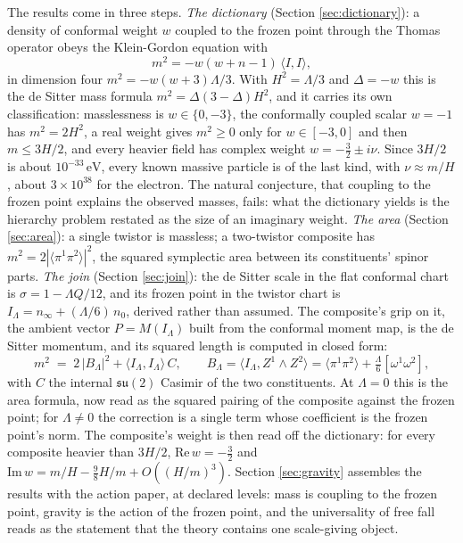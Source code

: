 \documentclass[11pt]{article}
\theoremstyle{definition}
\newcommand{\ip}[2]{\langle #1, #2\rangle}
\newcommand{\br}[1]{\langle #1\rangle}
\begin{document}
The results come in three steps. \emph{The dictionary} (Section \ref{sec:dictionary}): a density of conformal weight $w$ coupled to the frozen point through the Thomas operator obeys the Klein-Gordon equation with
\[
m^{2} = -w(w+n-1)\,\ip{I}{I},
\]
in dimension four $m^{2} = -w(w+3)\Lambda/3$. With $H^{2} = \Lambda/3$ and $\Delta = -w$ this is the de Sitter mass formula $m^{2} = \Delta(3-\Delta)H^{2}$, and it carries its own classification: masslessness is $w \in \{0, -3\}$, the conformally coupled scalar $w = -1$ has $m^{2} = 2H^{2}$, a real weight gives $m^{2} \ge 0$ only for $w \in [-3, 0]$ and then $m \le 3H/2$, and every heavier field has complex weight $w = -\tfrac32 \pm i\nu$. Since $3H/2$ is about $10^{-33}\,\mathrm{eV}$, every known massive particle is of the last kind, with $\nu \approx m/H$, about $3 \times 10^{38}$ for the electron. The natural conjecture, that coupling to the frozen point explains the observed masses, fails: what the dictionary yields is the hierarchy problem restated as the size of an imaginary weight. \emph{The area} (Section \ref{sec:area}): a single twistor is massless; a two-twistor composite has $m^{2} = 2|\br{\pi^{1}\pi^{2}}|^{2}$, the squared symplectic area between its constituents' spinor parts. \emph{The join} (Section \ref{sec:join}): the de Sitter scale in the flat conformal chart is $\sigma = 1 - \Lambda Q/12$, and its frozen point in the twistor chart is $I_{\Lambda} = n_{\infty} + (\Lambda/6)\,n_{0}$, derived rather than assumed. The composite's grip on it, the ambient vector $P = M(I_{\Lambda})$ built from the conformal moment map, is the de Sitter momentum, and its squared length is computed in closed form:
\[
m^{2} \;=\; 2\,|B_{\Lambda}|^{2} + \ip{I_{\Lambda}}{I_{\Lambda}}\,C, \qquad B_{\Lambda} = \ip{I_{\Lambda}}{Z^{1}\wedge Z^{2}} = \br{\pi^{1}\pi^{2}} + \tfrac{\Lambda}{6}[\omega^{1}\omega^{2}],
\]
with $C$ the internal $\mathfrak{su}(2)$ Casimir of the two constituents. At $\Lambda = 0$ this is the area formula, now read as the squared pairing of the composite against the frozen point; for $\Lambda \neq 0$ the correction is a single term whose coefficient is the frozen point's norm. The composite's weight is then read off the dictionary: for every composite heavier than $3H/2$, $\mathrm{Re}\,w = -\tfrac32$ and $\mathrm{Im}\,w = m/H - \tfrac98 H/m + O((H/m)^{3})$. Section \ref{sec:gravity} assembles the results with the action paper, at declared levels: mass is coupling to the frozen point, gravity is the action of the frozen point, and the universality of free fall reads as the statement that the theory contains one scale-giving object.
\end{document}
